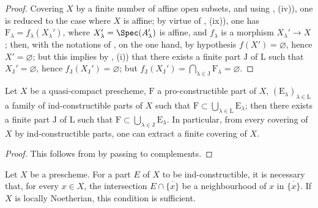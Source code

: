 \begin{proof}
Covering $X$ by a finite number of affine open subsets, and using , (iv)), one is reduced to the case where $X$ is affine; by virtue of , (ix)), one has $\mathrm{F}_\lambda=f_\lambda(X_\lambda')$,
where $X_\lambda'=\Spec(A_\lambda')$ is affine, and $f_\lambda$ is a morphism $X_\lambda'\to X$; then, with the notations of , on the one hand, by hypothesis $f(X')=\varnothing$, hence $X'=\varnothing$; but this implies by , (i)) that there exists a finite part $\mathrm{J}$ of $\mathrm{L}$ such that $X_\mathrm{J}'=\varnothing$, hence $f_\mathrm{J}(X_\mathrm{J}')=\varnothing$; but $f_\mathrm{J}(X_\mathrm{J}')=\bigcap_{\lambda\in\mathrm{J}} \mathrm{F}_\lambda=\varnothing$.
\end{proof}

\begin{corollary}[1.9.9]
\label{IV.1.9.9}
Let $X$ be a quasi-compact prescheme, $\mathrm{F}$ a pro-constructible part of $X$, $(\mathrm{E}_\lambda)_{\lambda\in\mathrm{L}}$ a family of ind-constructible parts of $X$ such that $\mathrm{F}\subset\bigcup_{\lambda\in\mathrm{L}} \mathrm{E}_\lambda$; then there exists a finite part $\mathrm{J}$ of $\mathrm{L}$ such that $\mathrm{F}\subset\bigcup_{\lambda\in\mathrm{J}} \mathrm{E}_\lambda$.
In particular, from every covering of $X$ by ind-constructible parts, one can extract a finite covering of $X$.
\end{corollary}

\begin{proof}
This follows from  by passing to complements.
\end{proof}

\begin{proposition}[1.9.10]
\label{IV.1.9.10}
Let $X$ be a prescheme.
For a part $E$ of $X$ to be ind-constructible, it is necessary that, for every $x\in X$, the intersection $E\cap\overline{\{x\}}$ be a neighbourhood of $x$ in $\overline{\{x\}}$.
If $X$ is locally Noetherian, this condition is sufficient.
\end{proposition}

